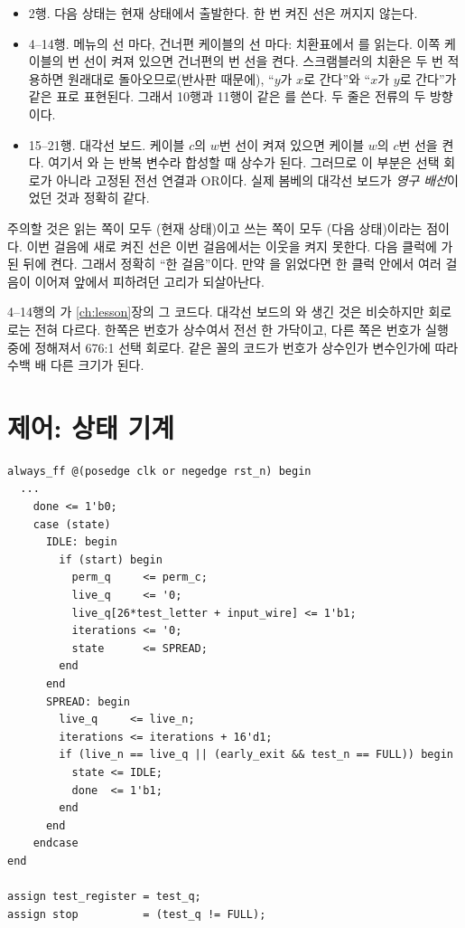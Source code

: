 \begin{itemize}
\item 2행. 다음 상태는 현재 상태에서 출발한다. 한 번 켜진 선은 꺼지지 않는다.
\item 4--14행. 메뉴의 선 마다, 건너편 케이블의 선 마다: 치환표에서 를
읽는다. 이쪽 케이블의 번 선이 켜져 있으면 건너편의 번 선을 켠다. 스크램블러의 치환은 두 번
적용하면 원래대로 돌아오므로(반사판 때문에), ``$y$가 $x$로 간다''와 ``$x$가 $y$로 간다''가 같은 표로 표현된다.
그래서 10행과 11행이 같은 를 쓴다. 두 줄은 전류의 두 방향이다.
\item 15--21행. 대각선 보드. 케이블 $c$의 $w$번 선이 켜져 있으면 케이블 $w$의 $c$번 선을 켠다. 여기서
와 는 반복 변수라 합성할 때 상수가 된다. 그러므로 이 부분은 선택 회로가 아니라 고정된 전선
연결과 OR이다. 실제 봄베의 대각선 보드가 \emph{영구 배선}이었던 것과 정확히 같다.
\end{itemize}

\Why 주의할 것은 읽는 쪽이 모두 (현재 상태)이고 쓰는 쪽이 모두 (다음 상태)이라는
점이다. 이번 걸음에 새로 켜진 선은 이번 걸음에서는 이웃을 켜지 못한다. 다음 클럭에 가 된 뒤에
켠다. 그래서 정확히 ``한 걸음''이다. 만약 을 읽었다면 한 클럭 안에서 여러 걸음이 이어져
앞에서 피하려던 고리가 되살아난다.

4--14행의 가 \ref{ch:lesson}장의 그 코드다. 대각선 보드의
와 생긴 것은 비슷하지만 회로로는 전혀 다르다. 한쪽은 번호가 상수여서 전선 한 가닥이고,
다른 쪽은 번호가 실행 중에 정해져서 676:1 선택 회로다. 같은 꼴의 코드가 번호가 상수인가 변수인가에 따라
수백 배 다른 크기가 된다.

\section{제어: 상태 기계}

\begin{lstlisting}[language=SV,caption={\code{bombe\_core.sv}: 제어(리셋 부분 생략).},label={lst:core-fsm}]
always_ff @(posedge clk or negedge rst_n) begin
  ...
    done <= 1'b0;
    case (state)
      IDLE: begin
        if (start) begin
          perm_q     <= perm_c;
          live_q     <= '0;
          live_q[26*test_letter + input_wire] <= 1'b1;
          iterations <= '0;
          state      <= SPREAD;
        end
      end
      SPREAD: begin
        live_q     <= live_n;
        iterations <= iterations + 16'd1;
        if (live_n == live_q || (early_exit && test_n == FULL)) begin
          state <= IDLE;
          done  <= 1'b1;
        end
      end
    endcase
end

assign test_register = test_q;
assign stop          = (test_q != FULL);
\end{lstlisting}

